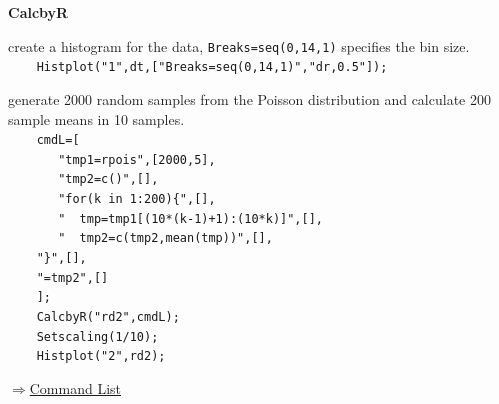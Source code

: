 \documentclass[papersize,a4paper,12pt]{article}
\newenvironment{cmd}[2]{
\hypertarget{#2}{}
\begin{center}{\bf\large #1}\end{center}
\begin{description}
}{
\end{description}
\begin{flushright} \hyperlink{functionlist}{$\Rightarrow$Command List}\end{flushright}
}
\begin{document}
\begin{cmd}{CalcbyR}{calcbyr}
create a histogram for the data, \verb|Breaks=seq(0,14,1)| specifies the bin size.\\
\verb|    Histplot("1",dt,["Breaks=seq(0,14,1)","dr,0.5"]);|\\

\begin{center}

\end{center}

generate 2000 random samples from the Poisson distribution and calculate 200 sample means in 10 samples.\\
\verb|    cmdL=[|\\
\verb|       "tmp1=rpois",[2000,5],|\\
\verb|       "tmp2=c()",[],|\\
\verb|       "for(k in 1:200){",[],|\\
\verb|       "  tmp=tmp1[(10*(k-1)+1):(10*k)]",[],|\\
\verb|       "  tmp2=c(tmp2,mean(tmp))",[],|\\
\verb|    "}",[],|\\
\verb|    "=tmp2",[]|\\
\verb|    ];|\\
\verb|    CalcbyR("rd2",cmdL);|\\
\verb|    Setscaling(1/10);|\\
\verb|    Histplot("2",rd2);|\\

\end{cmd}
\end{document}
